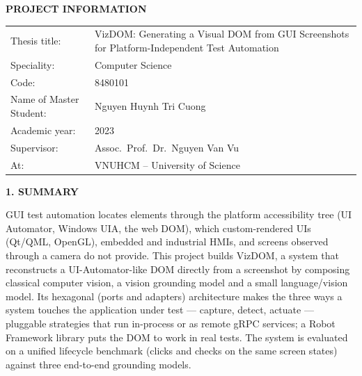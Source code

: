\documentclass[11pt,a4paper]{article}
\newcommand{\thesistitle}{VizDOM: Generating a Visual DOM from GUI Screenshots
  for Platform-Independent Test Automation}
\begin{document}
\begin{center}
{\large\bfseries PROJECT INFORMATION}
\end{center}

\begin{tabular}{@{}p{}@{}p{}@{}}
Thesis title: & \thesistitle\\
Speciality: & Computer Science\\
Code: & 8480101\\
Name of Master Student: & Nguyen Huynh Tri Cuong\\
Academic year: & 2023\\
Supervisor: & Assoc.\ Prof.\ Dr.\ Nguyen Van Vu\\
At: & VNUHCM -- University of Science
\end{tabular}

\textbf{1. SUMMARY}

GUI test automation locates elements through the platform accessibility tree
(UI Automator, Windows UIA, the web DOM), which custom-rendered UIs (Qt/QML,
OpenGL), embedded and industrial HMIs, and screens observed through a camera do not
provide. This project builds VizDOM, a system that reconstructs a UI-Automator-like
DOM directly from a screenshot by composing classical computer vision, a vision
grounding model and a small language/vision model. Its hexagonal (ports and
adapters) architecture makes the three ways a system touches the application under
test --- capture, detect, actuate --- pluggable strategies that run in-process or as
remote gRPC services; a Robot Framework library puts the DOM to work in real tests.
The system is evaluated on a unified lifecycle benchmark (clicks and checks on the
same screen states) against three end-to-end grounding models.
\end{document}
